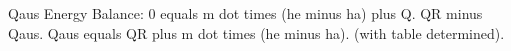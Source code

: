Qaus  
Energy Balance:  
0 equals m dot times (he minus ha) plus Q.  
QR minus Qaus.  
Qaus equals QR plus m dot times (he minus ha).  
(with table determined).